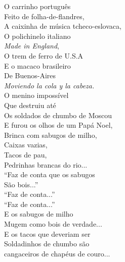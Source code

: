 \begin{minipage}[t]{0.32\linewidth}
O carrinho português\\
Feito de folha-de-flandres,\\
A caixinha de música tcheco-eslovaca,\\
O polichinelo italiano\\
\textit{Made in England},\\
O trem de ferro de U.S.A\\
E o macaco brasileiro\\
De Buenos-Aires\\
\textit{Moviendo la cola y la cabeza.}\\[0.6em]
O menino impossível\\
Que destruiu até\\
Os soldados de chumbo de Moscou\\
E furou os olhos de um Papá Noel,\\
Brinca com sabugos de milho,\\
Caixas vazias,\\
Tacos de pau,\\
Pedrinhas brancas do rio...\\[0.6em]
“Faz de conta que os sabugos\\
São bois...”\\
“Faz de conta...”\\
“Faz de conta...”\\[0.6em]
E os sabugos de milho\\
Mugem como bois de verdade...\\[0.6em]
E os tacos que deveriam ser\\
Soldadinhos de chumbo são\\
cangaceiros de chapéus de couro...
\end{minipage}\hfill
